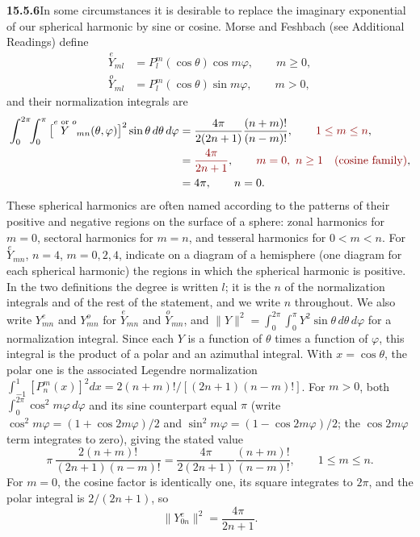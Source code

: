 \par\bigskip
\noindent\textbf{15.5.6}\quad In some circumstances it is desirable to
replace the imaginary exponential of our spherical harmonic by sine
or cosine. Morse and Feshbach (see Additional Readings) define
\begin{align*}
\overset{e}{Y}_{ml}&=P_{l}^{m}(\cos\theta)\cos m\varphi,\qquad m\ge0,\\
\overset{o}{Y}_{ml}&=P_{l}^{m}(\cos\theta)\sin m\varphi,\qquad m>0,
\end{align*}
and their normalization integrals are
\begin{align*}
\int_{0}^{2\pi}\!\!\int_{0}^{\pi}
\big[\overset{e\text{ or }o}{Y}_{mn}(\theta,\varphi)\big]^{2}
\sin\theta\,d\theta\,d\varphi
&=\frac{4\pi}{2(2n+1)}\frac{(n+m)!}{(n-m)!},
\qquad \erratum{1\le m\le n},\\
&=\erratum{\frac{4\pi}{2n+1}},\qquad
\erratum{m=0,\ n\ge1\quad\text{(cosine family)}},\\
&=4\pi,\qquad n=0.
\end{align*}
These spherical harmonics are often named according to the patterns
of their positive and negative regions on the surface of a sphere:
zonal harmonics for $m=0$, sectoral harmonics for $m=n$, and tesseral
harmonics for $0<m<n$. For $\overset{e}{Y}_{mn}$, $n=4$, $m=0,2,4$,
indicate on a diagram of a hemisphere (one diagram for each spherical
harmonic) the regions in which the spherical harmonic is positive.
\solution
In the two definitions the degree is written $l$; it is the $n$ of the
normalization integrals and of the rest of the statement, and we write
$n$ throughout. We also write $Y^e_{mn}$ and $Y^o_{mn}$ for
$\overset{e}{Y}_{mn}$ and $\overset{o}{Y}_{mn}$, and
$\|Y\|^2=\int_0^{2\pi}\!\int_0^\pi Y^2\sin\theta\,d\theta\,d\varphi$
for a normalization integral. Since each $Y$ is a function of $\theta$
times a function of $\varphi$, this integral is the product of a polar
and an azimuthal integral. With $x=\cos\theta$,
the polar one is the associated Legendre normalization
$\int_{-1}^1[P_n^m(x)]^2dx=2(n+m)!/[(2n+1)(n-m)!]$. For $m>0$, both
$\int_0^{2\pi}\cos^2m\varphi\,d\varphi$ and its sine counterpart
equal $\pi$ (write $\cos^2m\varphi=(1+\cos2m\varphi)/2$ and
$\sin^2m\varphi=(1-\cos2m\varphi)/2$; the $\cos2m\varphi$ term
integrates to zero), giving the stated value
\[
\pi\,\frac{2(n+m)!}{(2n+1)(n-m)!}
=\frac{4\pi}{2(2n+1)}\frac{(n+m)!}{(n-m)!},\qquad 1\le m\le n.
\]
For $m=0$, the cosine factor is identically one, its square integrates
to $2\pi$, and the polar integral is $2/(2n+1)$, so
\[
\boxed{\|Y^e_{0n}\|^2=\frac{4\pi}{2n+1}}.
\]

